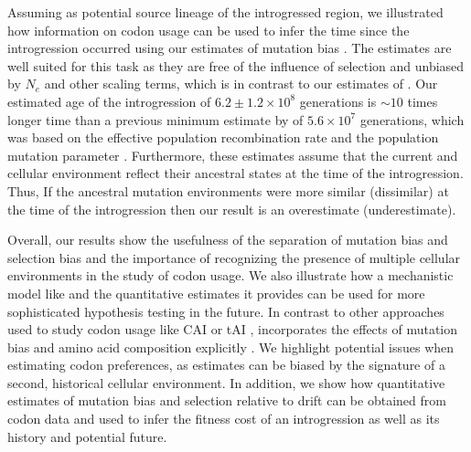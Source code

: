 \documentclass[fleqn,letterpaper]{article}
\begin{document}
Assuming \gossypii as potential source lineage of the introgressed region, we illustrated how information on codon usage can be used to infer the time since the introgression occurred using our estimates of mutation bias \DM.
The \DM estimates are well suited for this task as they are free of the influence of selection and unbiased by $N_e$ and other scaling terms, which is in contrast to our estimates of \DE \citep{gilchrist2015}.
Our estimated age of the introgression of $6.2\pm1.2\times 10^8$ generations is $\sim 10$ times longer time than a previous minimum estimate by \citet{friedrich2015} of $5.6\times 10^7$ generations, which was based on the effective population recombination rate and the population mutation parameter \citep{Ruderfer2006}.
Furthermore, these estimates assume that the current \gossypii and \kluyveri cellular environment reflect their ancestral states at the time of the introgression.
Thus, If the ancestral mutation environments were more similar (dissimilar) at the time of the introgression then our result is an overestimate (underestimate).

Overall, our results show the usefulness of the separation of mutation bias and selection bias and the importance of recognizing the presence of multiple cellular environments in the study of codon usage.
We also illustrate how a mechanistic model like \ROC and the quantitative estimates it provides can be used for more sophisticated hypothesis testing in the future.
In contrast to other approaches used to study codon usage like CAI \citep{sharp1987} or tAI \citep{dosreis2004}, \ROC incorporates the effects of mutation bias and amino acid composition explicitly \citep{cope2018}.
We highlight potential issues when estimating codon preferences, as estimates can be biased by the signature of a second, historical cellular environment.
In addition, we show how quantitative estimates of mutation bias and selection relative to drift can be obtained from codon data and used to infer the fitness cost of an introgression as well as its history and potential future.


\end{document}
